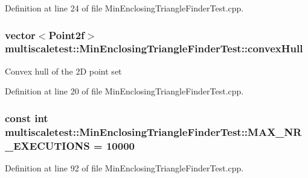 \-Definition at line 24 of file \-Min\-Enclosing\-Triangle\-Finder\-Test.\-cpp.

\hypertarget{classmultiscaletest_1_1MinEnclosingTriangleFinderTest_a309e2484e202fab797520fc15517d95d}{
\subsubsection[{convex\-Hull}]{\setlength{\rightskip}{0pt plus 5cm}vector$<$\-Point2f$>$ {\bf multiscaletest\-::\-Min\-Enclosing\-Triangle\-Finder\-Test\-::convex\-Hull}}}\label{classmultiscaletest_1_1MinEnclosingTriangleFinderTest_a309e2484e202fab797520fc15517d95d}
\-Convex hull of the 2\-D point set 

\-Definition at line 20 of file \-Min\-Enclosing\-Triangle\-Finder\-Test.\-cpp.

\hypertarget{classmultiscaletest_1_1MinEnclosingTriangleFinderTest_a061721ac8458f238f964b3f63088df8a}{
\subsubsection[{\-M\-A\-X\-\_\-\-N\-R\-\_\-\-E\-X\-E\-C\-U\-T\-I\-O\-N\-S}]{\setlength{\rightskip}{0pt plus 5cm}const int {\bf multiscaletest\-::\-Min\-Enclosing\-Triangle\-Finder\-Test\-::\-M\-A\-X\-\_\-\-N\-R\-\_\-\-E\-X\-E\-C\-U\-T\-I\-O\-N\-S} = 10000}}\label{classmultiscaletest_1_1MinEnclosingTriangleFinderTest_a061721ac8458f238f964b3f63088df8a}


\-Definition at line 92 of file \-Min\-Enclosing\-Triangle\-Finder\-Test.\-cpp.

